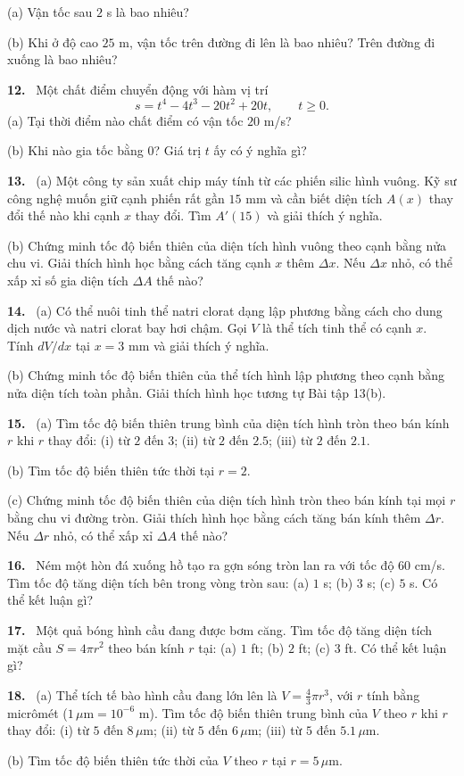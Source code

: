 \documentclass[12pt,a4paper]{article}
\newcommand{\bt}[1]{\par\smallskip\noindent\textbf{#1.}\ }
\begin{document}
(a) Vận tốc sau $2$ s là bao nhiêu?

(b) Khi ở độ cao $25$ m, vận tốc trên đường đi lên là bao nhiêu? Trên đường đi xuống là bao nhiêu?
\bt{12} Một chất điểm chuyển động với hàm vị trí
\[s=t^4-4t^3-20t^2+20t,\qquad t\ge0.\]
(a) Tại thời điểm nào chất điểm có vận tốc $20$ m/s?

(b) Khi nào gia tốc bằng $0$? Giá trị $t$ ấy có ý nghĩa gì?
\bt{13} (a) Một công ty sản xuất chip máy tính từ các phiến silic hình vuông. Kỹ sư công nghệ muốn giữ cạnh phiến rất gần $15$ mm và cần biết diện tích $A(x)$ thay đổi thế nào khi cạnh $x$ thay đổi. Tìm $A'(15)$ và giải thích ý nghĩa.

(b) Chứng minh tốc độ biến thiên của diện tích hình vuông theo cạnh bằng nửa chu vi. Giải thích hình học bằng cách tăng cạnh $x$ thêm $\Delta x$. Nếu $\Delta x$ nhỏ, có thể xấp xỉ số gia diện tích $\Delta A$ thế nào?
\bt{14} (a) Có thể nuôi tinh thể natri clorat dạng lập phương bằng cách cho dung dịch nước và natri clorat bay hơi chậm. Gọi $V$ là thể tích tinh thể có cạnh $x$. Tính $dV/dx$ tại $x=3$ mm và giải thích ý nghĩa.

(b) Chứng minh tốc độ biến thiên của thể tích hình lập phương theo cạnh bằng nửa diện tích toàn phần. Giải thích hình học tương tự Bài tập 13(b).
\bt{15} (a) Tìm tốc độ biến thiên trung bình của diện tích hình tròn theo bán kính $r$ khi $r$ thay đổi: (i) từ $2$ đến $3$; (ii) từ $2$ đến $2.5$; (iii) từ $2$ đến $2.1$.

(b) Tìm tốc độ biến thiên tức thời tại $r=2$.

(c) Chứng minh tốc độ biến thiên của diện tích hình tròn theo bán kính tại mọi $r$ bằng chu vi đường tròn. Giải thích hình học bằng cách tăng bán kính thêm $\Delta r$. Nếu $\Delta r$ nhỏ, có thể xấp xỉ $\Delta A$ thế nào?
\bt{16} Ném một hòn đá xuống hồ tạo ra gợn sóng tròn lan ra với tốc độ $60$ cm/s. Tìm tốc độ tăng diện tích bên trong vòng tròn sau: (a) $1$ s; (b) $3$ s; (c) $5$ s. Có thể kết luận gì?
\bt{17} Một quả bóng hình cầu đang được bơm căng. Tìm tốc độ tăng diện tích mặt cầu $S=4\pi r^2$ theo bán kính $r$ tại: (a) $1$ ft; (b) $2$ ft; (c) $3$ ft. Có thể kết luận gì?
\bt{18} (a) Thể tích tế bào hình cầu đang lớn lên là $V=\frac43\pi r^3$, với $r$ tính bằng micrômét ($1\,\mu\mathrm m=10^{-6}$ m). Tìm tốc độ biến thiên trung bình của $V$ theo $r$ khi $r$ thay đổi: (i) từ $5$ đến $8\,\mu$m; (ii) từ $5$ đến $6\,\mu$m; (iii) từ $5$ đến $5.1\,\mu$m.

(b) Tìm tốc độ biến thiên tức thời của $V$ theo $r$ tại $r=5\,\mu$m.
\end{document}
